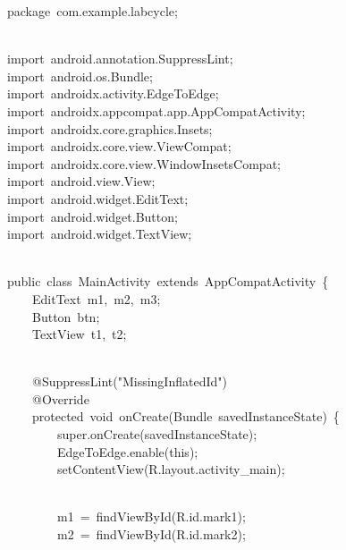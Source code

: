 {\ttfamily\small package\ com.example.labcycle;} \\
\strut \\
{\ttfamily\small import\ android.annotation.SuppressLint;} \\
{\ttfamily\small import\ android.os.Bundle;} \\
{\ttfamily\small import\ androidx.activity.EdgeToEdge;} \\
{\ttfamily\small import\ androidx.appcompat.app.AppCompatActivity;} \\
{\ttfamily\small import\ androidx.core.graphics.Insets;} \\
{\ttfamily\small import\ androidx.core.view.ViewCompat;} \\
{\ttfamily\small import\ androidx.core.view.WindowInsetsCompat;} \\
{\ttfamily\small import\ android.view.View;} \\
{\ttfamily\small import\ android.widget.EditText;} \\
{\ttfamily\small import\ android.widget.Button;} \\
{\ttfamily\small import\ android.widget.TextView;} \\
\strut \\
{\ttfamily\small public\ class\ MainActivity\ extends\ AppCompatActivity\ \{} \\
{\ttfamily\small \ \ \ \ EditText\ m1,\ m2,\ m3;} \\
{\ttfamily\small \ \ \ \ Button\ btn;} \\
{\ttfamily\small \ \ \ \ TextView\ t1,\ t2;} \\
\strut \\
{\ttfamily\small \ \ \ \ @SuppressLint("MissingInflatedId")} \\
{\ttfamily\small \ \ \ \ @Override} \\
{\ttfamily\small \ \ \ \ protected\ void\ onCreate(Bundle\ savedInstanceState)\ \{} \\
{\ttfamily\small \ \ \ \ \ \ \ \ super.onCreate(savedInstanceState);} \\
{\ttfamily\small \ \ \ \ \ \ \ \ EdgeToEdge.enable(this);} \\
{\ttfamily\small \ \ \ \ \ \ \ \ setContentView(R.layout.activity\_main);} \\
\strut \\
{\ttfamily\small \ \ \ \ \ \ \ \ m1\ =\ findViewById(R.id.mark1);} \\
{\ttfamily\small \ \ \ \ \ \ \ \ m2\ =\ findViewById(R.id.mark2);} \\
